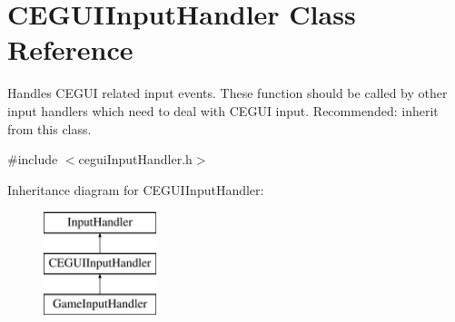 \hypertarget{classCEGUIInputHandler}{
\section{\-C\-E\-G\-U\-I\-Input\-Handler \-Class \-Reference}
\label{db/d68/classCEGUIInputHandler}
}


\-Handles \-C\-E\-G\-U\-I related input events. \-These function should be called by other input handlers which need to deal with \-C\-E\-G\-U\-I input. \-Recommended\-: inherit from this class.  




{\ttfamily \#include $<$cegui\-Input\-Handler.\-h$>$}

\-Inheritance diagram for \-C\-E\-G\-U\-I\-Input\-Handler\-:\begin{figure}[H]
\begin{center}
\leavevmode
\includegraphics[height=3.000000cm]{db/d68/classCEGUIInputHandler}
\end{center}
\end{figure}
